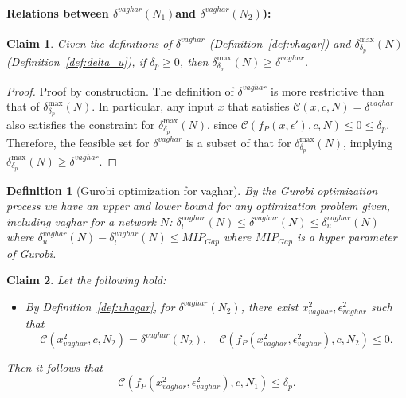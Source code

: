 \documentclass[11pt]{article}
\newtheorem{definition}{Definition}
\newtheorem{claim}{Claim}
\begin{document}

\paragraph{Relations between $\delta^{vaghar}(N_1)$and $\delta^{vaghar}(N_2)$):}
\begin{claim}\label{claim:delta_u_is_bigger_delta_v}
Given the definitions of $\delta^{vaghar}$ (Definition~\ref{def:vhagar}) and $\delta^\text{max}_{\delta_p}(N)$ (Definition~\ref{def:delta_u}), if $\delta_p \geq 0$, then $\delta^\text{max}_{\delta_p}(N) \geq \delta^{vaghar}$.
\end{claim}

\begin{proof}
Proof by construction. The definition of $\delta^{vaghar}$ is more restrictive than that of $\delta^\text{max}_{\delta_p}(N)$. In particular, any input $x$ that satisfies $\mathcal{C}(x, c, N) = \delta^{vaghar}$ also satisfies the constraint for $\delta^\text{max}_{\delta_p}(N)$, since $\mathcal{C}(f_P(x, \epsilon'), c, N) \leq 0 \leq \delta_p$. Therefore, the feasible set for $\delta^{vaghar}$ is a subset of that for $\delta^\text{max}_{\delta_p}(N)$, implying $\delta^\text{max}_{\delta_p}(N) \geq \delta^{vaghar}$.
\end{proof}

\begin{definition}[Gurobi optimization for vaghar]\label{def:delta_u_delta_l}
By the Gurobi optimization process we have an upper and lower bound for any optimization problem given, including vaghar for a network $N$: $\delta_l^{vaghar}(N) \leq \delta^{vaghar}(N) \leq \delta_u^{vaghar}(N)$ where $\delta_u^{vaghar}(N)-\delta_l^{vaghar}(N)\leq MIP_{Gap}$ where $MIP_{Gap}$ is a hyper parameter of Gurobi.
\end{definition}

\begin{claim}\label{claim:x2_eps_N1}
Let the following hold:
\begin{itemize}
    \item By Definition~\ref{def:vhagar}, for $\delta^{vaghar}(N_2)$, there exist $x^2_{vaghar}, \epsilon^2_{vaghar}$ such that
    \[
    \mathcal{C}(x^2_{vaghar}, c, N_2) = \delta^{vaghar}(N_2),\quad \mathcal{C}(f_P(x^2_{vaghar}, \epsilon^2_{vaghar}), c, N_2) \leq 0.
    \]
\end{itemize}
Then it follows that
\[
\mathcal{C}(f_P(x^2_{vaghar}, \epsilon^2_{vaghar}), c, N_1) \leq \delta_p.
\]
\end{claim}
\end{document}
